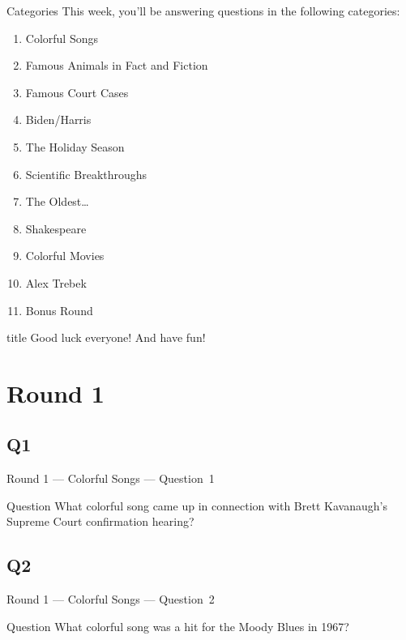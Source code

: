 \documentclass[11pt]{beamer}
\begin{document}
\begingroup{}
\begingroup{}
\begin{frame}[t]{Categories}
This week, you'll be answering questions in the following categories:
\begin{enumerate}
\item Colorful Songs
\item Famous Animals in Fact and Fiction
\item Famous Court Cases
\item Biden/Harris
\item The Holiday Season
\item Scientific Breakthroughs
\item The Oldest\ldots
\item Shakespeare
\item Colorful Movies
\item Alex Trebek
\item Bonus Round
\end{enumerate}
\end{frame}
\endgroup{}

\begingroup{}
\begin{frame}
\vfill{}
\begin{beamercolorbox}[sep=8pt,center,shadow=true,rounded=true]{title}
Good luck everyone! And have fun!
\end{beamercolorbox}
\vfill{}
\end{frame}
\endgroup{}
\def\thisSectionName{Colorful Songs}
\section{Round 1}
\subsection*{Q1}
\begin{frame}[t]{Round 1 --- Colorful Songs --- \mbox{Question 1}}
\vspace{-0.5em}
\begin{block}{Question}
What colorful song came up in connection with Brett Kavanaugh's Supreme Court confirmation hearing?
\end{block}
\end{frame}
\subsection*{Q2}
\begin{frame}[t]{Round 1 --- Colorful Songs --- \mbox{Question 2}}
\vspace{-0.5em}
\begin{block}{Question}
What colorful song was a hit for the Moody Blues in 1967?
\end{block}
\end{frame}
\end{document}
